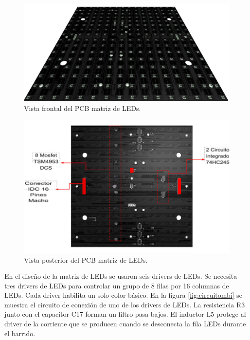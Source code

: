 \begin{figure}[htpb]
	\centering
	\includegraphics[scale=0.4]{Figures/pcbfullcolorfrontrender.jpg} 
	\caption{Vista frontal del PCB matriz de LEDs.}
	\label{fig:pcbrenderfront}
\end{figure}
\begin{figure}[htpb]
	\centering
	\includegraphics[scale=0.5]{Figures/pcbfullcolorbackrender.jpg} 
	\caption{Vista posterior del PCB matriz de LEDs.}
	\label{fig:pcbrenderback}
\end{figure}

En el diseño de la matriz de LEDs se usaron seis drivers de LEDs. Se necesita tres drivers de LEDs para controlar un grupo de 8 filas por 16 columnas de LEDs. Cada driver habilita un solo color básico. En la figura \ref{fig:circuitombi} se muestra el circuito de conexión de uno de los drivers de LEDs. La resistencia R3 junto con el capacitor C17 forman un filtro pasa bajos. El inductor L5 protege al driver de la corriente que se producen cuando se desconecta la fila LEDs durante el barrido. 

